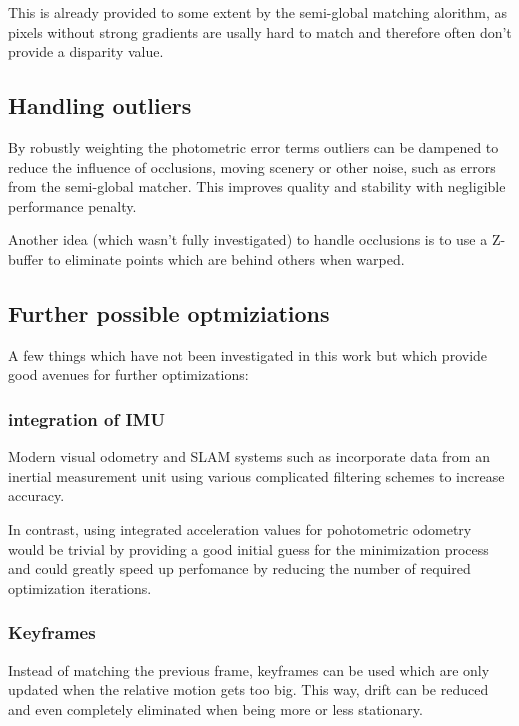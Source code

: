 This is already provided to some extent by the semi-global matching alorithm,
as pixels without strong gradients are usally hard to match and therefore often
don't provide a disparity value.

\subsection{Handling outliers}

By robustly weighting the photometric error terms outliers can be dampened to
reduce the influence of occlusions, moving scenery or other noise, such as
errors from the semi-global matcher. This improves quality and stability with
negligible performance penalty.

Another idea (which wasn't fully investigated) to handle occlusions is to use a
Z-buffer to eliminate points which are behind others when warped.


\subsection{Further possible optmiziations}

A few things which have not been investigated in this work but which provide
good avenues for further optimizations:

\subsubsection{integration of IMU}

Modern visual odometry and SLAM systems such as \cite{leutenegger2013keyframe}
incorporate data from an inertial measurement unit using various complicated
filtering schemes to increase accuracy.

In contrast, using integrated acceleration values for pohotometric odometry
would be trivial by providing a good initial guess for the minimization process
and could greatly speed up perfomance by reducing the number of required
optimization iterations.

\subsubsection{Keyframes}

Instead of matching the previous frame, keyframes can be used which are only
updated when the relative motion gets too big. This way, drift can be reduced
and even completely eliminated when being more or less stationary.

